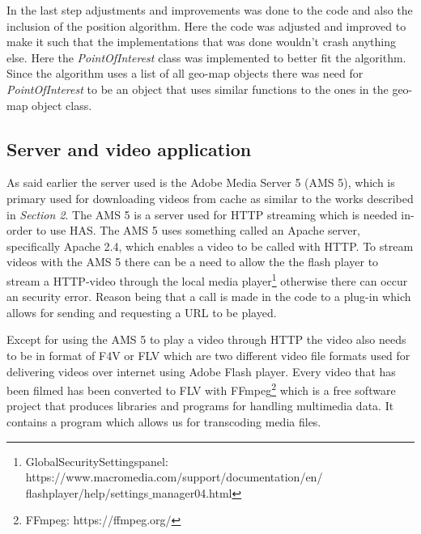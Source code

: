 \documentclass[9pt,a4paper]{acmproc}
\begin{document}
In the last step adjustments and improvements was done to the code and also the inclusion of the position algorithm. Here the code was adjusted and improved to make it such that the implementations that was done wouldn't crash anything else. Here the \textit{PointOfInterest} class was implemented to better fit the algorithm. Since the algorithm uses a list of all geo-map objects there was need for \textit{PointOfInterest} to be an object that uses similar functions to the ones in the geo-map object class. 



\subsection{Server and video application}

As said earlier the server used is the Adobe Media Server 5 (AMS 5), which is primary used for downloading videos from cache as similar to the works described in \textit{Section 2}. The AMS 5 is a server used for HTTP streaming which is needed in-order to use HAS. The AMS 5 uses something called an Apache server, specifically Apache 2.4, which enables a video to be called with HTTP. To stream videos with the AMS 5 there can be a need to allow the the flash player to stream a HTTP-video through the local media player\footnote{Global\:Security\:Settings\:panel: https://www.macromedia.com/support/documentation/en/\\flashplayer/help/settings$\_$manager04.html} otherwise there can occur an security error. Reason being that a call is made in the code to a plug-in which allows for sending and requesting a URL to be played.

Except for using the AMS 5 to play a video through HTTP the video also needs to be in format of F4V or FLV which are two different video file formats used for delivering videos over internet using Adobe Flash player. Every video that has been filmed has been converted to FLV with FFmpeg\footnote{FFmpeg: https://ffmpeg.org/} which is a free software project that produces libraries and programs for handling multimedia data. It contains a program which allows us for transcoding media files.
\end{document}
